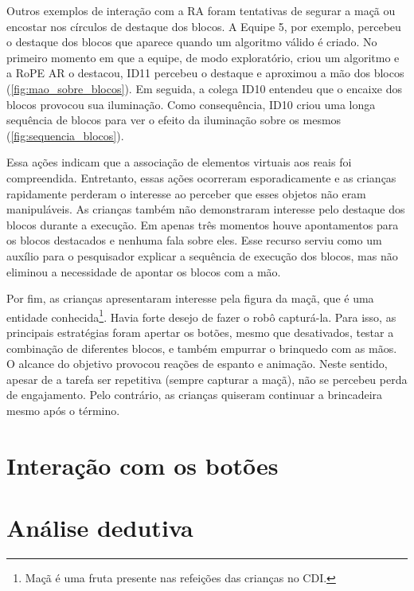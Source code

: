 Outros exemplos de interação com a RA foram tentativas de segurar a maçã ou encostar nos círculos de destaque dos blocos. A Equipe 5, por exemplo, percebeu o destaque dos blocos que aparece quando um algoritmo válido é criado. No primeiro momento em que a equipe, de modo exploratório, criou um algoritmo e a RoPE AR o destacou, ID11 percebeu o destaque e aproximou a mão dos blocos (\autoref{fig:mao_sobre_blocos}). Em seguida, a colega ID10 entendeu que o encaixe dos blocos provocou sua iluminação. Como consequência, ID10 criou uma longa sequência de blocos para ver o efeito da iluminação sobre os mesmos  (\autoref{fig:sequencia_blocos}).

Essa ações indicam que a associação de elementos virtuais aos reais foi compreendida. Entretanto, essas ações ocorreram esporadicamente e as crianças rapidamente perderam o interesse ao perceber que esses objetos não eram manipuláveis. As crianças também não demonstraram interesse pelo destaque dos blocos durante a execução. Em apenas três momentos houve apontamentos para os blocos destacados e nenhuma fala sobre eles. Esse recurso serviu como um auxílio para o pesquisador explicar a sequência de execução dos blocos, mas não eliminou a necessidade de apontar os blocos com a mão.

Por fim, as crianças apresentaram interesse pela figura da maçã, que é uma entidade conhecida\footnote{Maçã é uma fruta presente nas refeições das crianças no CDI.}. Havia forte desejo de fazer o robô capturá-la. Para isso, as principais estratégias foram apertar os botões, mesmo que desativados, testar a combinação de diferentes blocos, e também empurrar o brinquedo com as mãos. O alcance do objetivo provocou reações de espanto e animação. Neste sentido, apesar de a tarefa ser repetitiva (sempre capturar a maçã), não se percebeu perda de engajamento. Pelo contrário, as crianças quiseram continuar a brincadeira mesmo após o término.

\section{Interação com os botões}

\section{Análise dedutiva}


